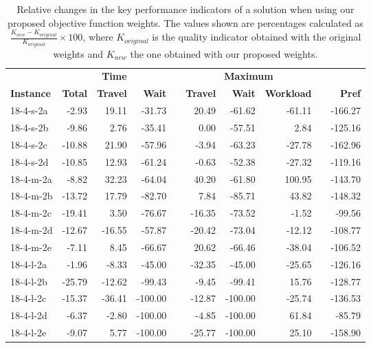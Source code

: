 \begin{table}[h]
\centering
\caption{Relative changes in the key performance indicators of a solution when using our proposed objective function weights. The values shown are percentages calculated as $\frac{K_{new} - K_{original}}{K_{original}}\times 100$, where $K_{original}$ is the quality indicator obtained with the original weights and $K_{new}$ the one obtained with our proposed weights.}
\scriptsize
\begin{tabular}{lrrrrrrrrr}
    \toprule
    & \multicolumn{3}{c}{\textbf{Time}} & \phantom{a}  & \multicolumn{3}{c}{\textbf{Maximum}} & &\\
    \cmidrule{2-4} \cmidrule{6-8}
    \textbf{Instance} & \textbf{Total} & \textbf{Travel} & \textbf{Wait} &  & \textbf{Travel} & \textbf{Wait} & \textbf{Workload} &&  \textbf{Pref}\\
    \midrule
    18-4-s-2a & -2.93 & 19.11 & -31.73 && 20.49 & -61.62 & -61.11 && -166.27 \\
    18-4-s-2b & -9.86 & 2.76 & -35.41 && 0.00 & -57.51 & 2.84 && -125.16 \\
    18-4-s-2c & -10.88 & 21.90 & -57.96 && -3.94 & -63.23 & -27.78 && -162.96 \\
    18-4-s-2d & -10.85 & 12.93 & -61.24 && -0.63 & -52.38 & -27.32 && -119.16 \\
    18-4-m-2a & -8.82 & 32.23 & -64.04 && 40.20 & -61.80 & 100.95 && -143.70 \\
    18-4-m-2b & -13.72 & 17.79 & -82.70 && 7.84 & -85.71 & 43.82 && -148.32 \\
    18-4-m-2c & -19.41 & 3.50 & -76.67 && -16.35 & -73.52 & -1.52 && -99.56 \\
    18-4-m-2d & -12.67 & -16.55 & -57.87 && -20.42 & -73.04 & -12.12 && -108.77 \\
    18-4-m-2e & -7.11 & 8.45 & -66.67 && 20.62 & -66.46 & -38.04 && -106.52 \\
    18-4-l-2a & -1.96 & -8.33 & -45.00 && -32.35 & -45.00 & -25.65 && -126.16 \\
    18-4-l-2b & -25.79 & -12.62 & -99.43 && -9.45 & -99.41 & 15.76 && -128.77 \\
    18-4-l-2c & -15.37 & -36.41 & -100.00 && -12.87 & -100.00 & -25.74 && -136.53 \\
    18-4-l-2d & -6.37 & -2.80 & -100.00 && -4.85 & -100.00 & 61.84 && -85.79 \\
    18-4-l-2e & -9.07 & 5.77 & -100.00 && -25.77 & -100.00 & 25.10 && -158.90 \\

\end{tabular}
\end{table}
